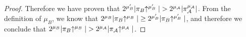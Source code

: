 \begin{proof}
    Therefore we have proven that $2^{\mu_B'}|\pi_B\negthickspace\uparrow^{\mu_B'}| >
    2^{\mu_\mathcal{A}}|\pi_\mathcal{A}^{\mu_\mathcal{A}}|$.
    From the definition of $\mu_B$, we know that
    $2^{\mu_B}|\pi_B\negthickspace\uparrow^{\mu_B}| \geq 2^{\mu_B'}|\pi_B\negthickspace\uparrow^{\mu_B'}|$,
    and therefore we conclude that $2^{\mu_B}|\pi_B\negthickspace\uparrow^{\mu_B}| >
    2^{\mu_\mathcal{A}}|\pi_\mathcal{A}\negthickspace\uparrow^{\mu_\mathcal{A}}|$.
    \Qed
%
\end{proof}
